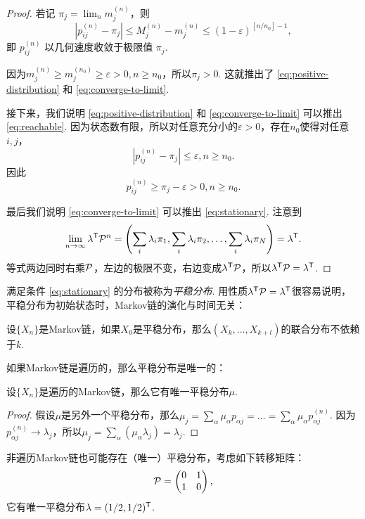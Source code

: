 \begin{proof}
若记 $\pi_j = \lim _n m_j^{(n)}$，则
\[
\left|p_{i j}^{(n)} - \pi_j\right| \leq M_j^{(n)} - m_j^{(n)} \leq (1-\varepsilon)^{\left[n / n_0\right] - 1},
\]
即 $p_{i j}^{(n)}$ 以几何速度收敛于极限值 $\pi_j$. 

因为$m_j^{(n)} \geqslant m_j^{\left(n_0\right)} \geqslant \varepsilon > 0, n \geqslant n_0$，所以$\pi_j > 0$. 这就推出了 \eqref{eq:positive-distribution} 和 \eqref{eq:converge-to-limit}. 

接下来，我们说明 \eqref{eq:positive-distribution} 和 \eqref{eq:converge-to-limit} 可以推出 \eqref{eq:reachable}.  因为状态数有限，所以对任意充分小的$\varepsilon > 0$，存在$n_0$使得对任意$i,j$，
\[
\left|p_{i j}^{(n)} - \pi_j\right| \leq \varepsilon, n \geq n_0.
\]
因此
\[
p_{i j}^{(n)} \geq \pi_j - \varepsilon > 0, n \geq n_0.
\]

最后我们说明 \eqref{eq:converge-to-limit} 可以推出 \eqref{eq:stationary}. 注意到
\[
\lim_{n \to \infty} \lambda^{\mathsf{T}} \mathcal P^n = \left(\sum_i \lambda_i \pi_1, \sum_i \lambda_i \pi_2, \ldots, \sum_i \lambda_i \pi_N\right)=\lambda^{\mathsf{T}}.
\]
等式两边同时右乘$\mathcal P$，左边的极限不变，右边变成$\lambda^{\mathsf{T}} \mathcal P$，所以$\lambda^{\mathsf{T}} \mathcal P = \lambda^{\mathsf{T}}$.
\end{proof}

满足条件 \eqref{eq:stationary} 的分布被称为\textit{平稳分布}. 用性质$\lambda^{\mathsf{T}} \mathcal P = \lambda^{\mathsf{T}}$很容易说明，平稳分布为初始状态时，Markov链的演化与时间无关：
\begin{proposition}\label{prop:stationary-distribution}
设$\{X_n\}$是Markov链，如果$X_0$是平稳分布，那么$(X_k,\dots,X_{k+l})$的联合分布不依赖于$k$.
\end{proposition}

如果Markov链是遍历的，那么平稳分布是唯一的：
\begin{proposition}\label{prop:unique-stationary-distribution}
设$\{X_n\}$是遍历的Markov链，那么它有唯一平稳分布$\mu$. 
\end{proposition}
    \begin{proof}
        假设$\mu$是另外一个平稳分布，那么$\mu_j=\sum_\alpha\mu_\alpha p_{\alpha j}=\dots=\sum_{\alpha}\mu_\alpha p_{\alpha j}^{(n)}$. 因为$p_{\alpha j}^{(n)}\to \lambda_j$，所以$\mu_j=\sum_{\alpha} (\mu_\alpha\lambda_j)=\lambda_j$.
    \end{proof}

非遍历Markov链也可能存在（唯一）平稳分布，考虑如下转移矩阵：
\[\mathcal P=\begin{pmatrix}0&1\\1&0\end{pmatrix},\]
它有唯一平稳分布$\lambda=(1/2,1/2)^{\mathsf{T}}$.


